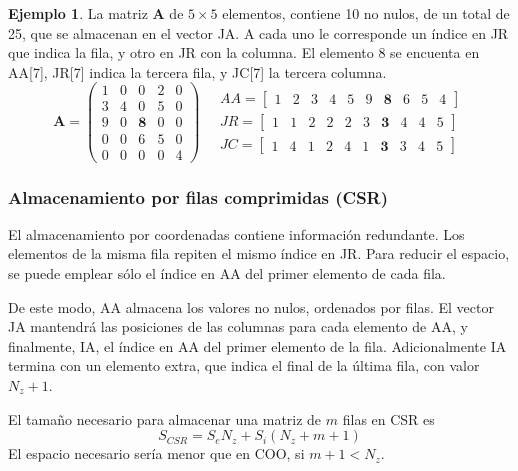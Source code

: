 \documentclass{article}
\newcommand*\mat[1]{ \begin{pmatrix} #1 \end{pmatrix}}
\newcommand*\arr[1]{ \begin{bmatrix} #1 \end{bmatrix}}
\theoremstyle{definition}
\newtheorem{ejemplo}{Ejemplo}[section]
\begin{document}
\begin{ejemplo}
La matriz \textbf{A} de $5\times5$ elementos, contiene 10 no nulos, de un total 
de 25, que se almacenan en el vector JA. A cada uno le corresponde un índice en 
JR que indica la fila, y otro en JR con la columna. El elemento 8 se encuenta en 
AA[7], JR[7] indica la tercera fila, y JC[7] la tercera columna.
$$ \textbf{A} = \mat{
	1 & 0 & 0 & 2 & 0 \\
	3 & 4 & 0 & 5 & 0 \\
	9 & 0 & \textbf{8} & 0 & 0 \\
	0 & 0 & 6 & 5 & 0 \\
	0 & 0 & 0 & 0 & 4 }
\quad
\begin{aligned}
	AA = \arr{ 1 & 2 & 3 & 4 & 5 & 9 & \textbf{8} & 6 & 5 & 4} \\
	JR = \arr{ 1 & 1 & 2 & 2 & 2 & 3 & \textbf{3} & 4 & 4 & 5} \\
	JC = \arr{ 1 & 4 & 1 & 2 & 4 & 1 & \textbf{3} & 3 & 4 & 5}
\end{aligned}
$$
\end{ejemplo}

\subsubsection{Almacenamiento por filas comprimidas (CSR)}

El almacenamiento por coordenadas contiene información redundante. Los elementos 
de la misma fila repiten el mismo índice en JR. Para reducir el espacio, se 
puede emplear sólo el índice en AA del primer elemento de cada fila.

De este modo, AA almacena los valores no nulos, ordenados por filas. El vector 
JA mantendrá las posiciones de las columnas para cada elemento de AA, y 
finalmente, IA, el índice en AA del primer elemento de la fila. Adicionalmente 
IA termina con un elemento extra, que indica el final de la última fila, con 
valor $N_z + 1$.

El tamaño necesario para almacenar una matriz de $m$ filas en CSR es
$$ S_{CSR} = S_e N_z + S_i (N_z + m + 1) $$
El espacio necesario sería menor que en COO, si $m + 1 < N_z$.
\end{document}
